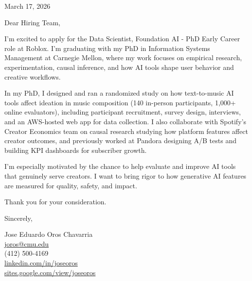 \documentclass[11pt,letterpaper]{article}
\begin{document}
\hfill March 17, 2026

Dear Hiring Team,

I'm excited to apply for the Data Scientist, Foundation AI - PhD Early Career role at Roblox. I'm graduating with my PhD in Information Systems Management at Carnegie Mellon, where my work focuses on empirical research, experimentation, causal inference, and how AI tools shape user behavior and creative workflows.

In my PhD, I designed and ran a randomized study on how text-to-music AI tools affect ideation in music composition (140 in-person participants, 1,000+ online evaluators), including participant recruitment, survey design, interviews, and an AWS-hosted web app for data collection. I also collaborate with Spotify's Creator Economics team on causal research studying how platform features affect creator outcomes, and previously worked at Pandora designing A/B tests and building KPI dashboards for subscriber growth.

I'm especially motivated by the chance to help evaluate and improve AI tools that genuinely serve creators. I want to bring rigor to how generative AI features are measured for quality, safety, and impact.

Thank you for your consideration.

Sincerely,

Jose Eduardo Oros Chavarria \\
\href{mailto:joros@cmu.edu}{joros@cmu.edu} \\
(412) 500-4169 \\
\href{https://www.linkedin.com/in/joseoros}{linkedin.com/in/joseoros} \\
\href{https://sites.google.com/view/joseoros}{sites.google.com/view/joseoros}
\end{document}
